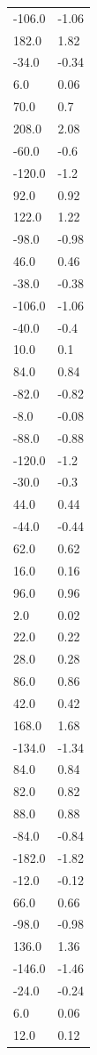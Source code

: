 \begin{longtable}{ll}
-106.0 & -1.06 \\
182.0 & 1.82 \\
-34.0 & -0.34 \\
6.0 & 0.06 \\
70.0 & 0.7 \\
208.0 & 2.08 \\
-60.0 & -0.6 \\
-120.0 & -1.2 \\
92.0 & 0.92 \\
122.0 & 1.22 \\
-98.0 & -0.98 \\
46.0 & 0.46 \\
-38.0 & -0.38 \\
-106.0 & -1.06 \\
-40.0 & -0.4 \\
10.0 & 0.1 \\
84.0 & 0.84 \\
-82.0 & -0.82 \\
-8.0 & -0.08 \\
-88.0 & -0.88 \\
-120.0 & -1.2 \\
-30.0 & -0.3 \\
44.0 & 0.44 \\
-44.0 & -0.44 \\
62.0 & 0.62 \\
16.0 & 0.16 \\
96.0 & 0.96 \\
2.0 & 0.02 \\
22.0 & 0.22 \\
28.0 & 0.28 \\
86.0 & 0.86 \\
42.0 & 0.42 \\
168.0 & 1.68 \\
-134.0 & -1.34 \\
84.0 & 0.84 \\
82.0 & 0.82 \\
88.0 & 0.88 \\
-84.0 & -0.84 \\
-182.0 & -1.82 \\
-12.0 & -0.12 \\
66.0 & 0.66 \\
-98.0 & -0.98 \\
136.0 & 1.36 \\
-146.0 & -1.46 \\
-24.0 & -0.24 \\
6.0 & 0.06 \\
12.0 & 0.12 \\

\end{longtable}
